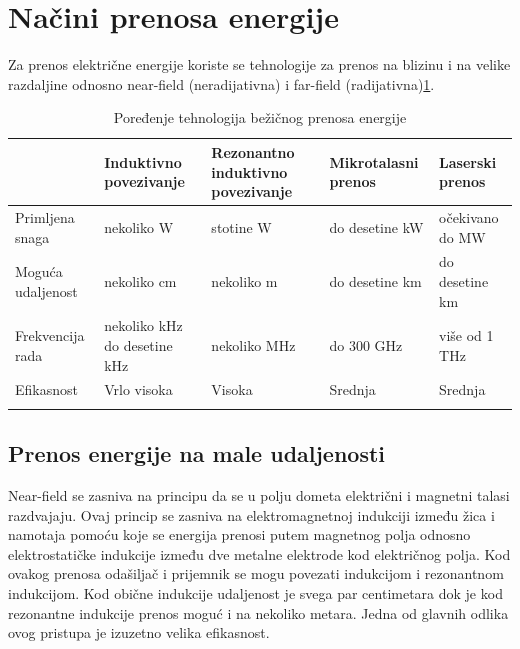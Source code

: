 \documentclass[a4paper]{article}
\begin{document}
\section{Načini prenosa energije}

Za prenos električne energije koriste se tehnologije za prenos na blizinu i na velike razdaljine odnosno near-field (neradijativna) i far-field (radijativna)\ref{fig:tabela}.



\begin{table}[h]
    \centering
    \caption{Poređenje tehnologija bežičnog prenosa energije}
    
    \begin{tabular}{|p{}|p{}|p{}|p{}|p{}|}
        \hline
    & Induktivno  povezivanje & Rezonantno induktivno povezivanje & Mikrotalasni prenos & Laserski prenos \\ \hline
    Primljena snaga  & nekoliko W & stotine W & do desetine kW & očekivano do MW\\ \hline
    Moguća udaljenost & nekoliko cm & nekoliko m & do desetine km & do desetine km \\ \hline
    Frekvencija rada & nekoliko kHz do desetine kHz & nekoliko MHz & do 300 GHz & više od 1 THz \\ \hline
    Efikasnost & Vrlo visoka & Visoka & Srednja & Srednja \\ \hline
        
    \label{fig:tabela}
    \end{tabular}
    \end{table}
    
    


\subsection{Prenos energije na male udaljenosti}
\label{subsec:prenosenergijenamaleudaljenosti}


Near-field se zasniva na principu da se u polju dometa električni i magnetni talasi razdvajaju.
Ovaj princip se zasniva na elektromagnetnoj indukciji između žica i namotaja pomoću koje se energija prenosi putem magnetnog polja odnosno elektrostatičke indukcije između dve metalne elektrode kod električnog polja.
Kod ovakog prenosa odašiljač i prijemnik se mogu povezati indukcijom i rezonantnom indukcijom.
Kod obične indukcije udaljenost je svega par centimetara dok je kod rezonantne indukcije prenos moguć i na nekoliko metara. Jedna od glavnih odlika ovog pristupa je izuzetno velika efikasnost.
\end{document}
